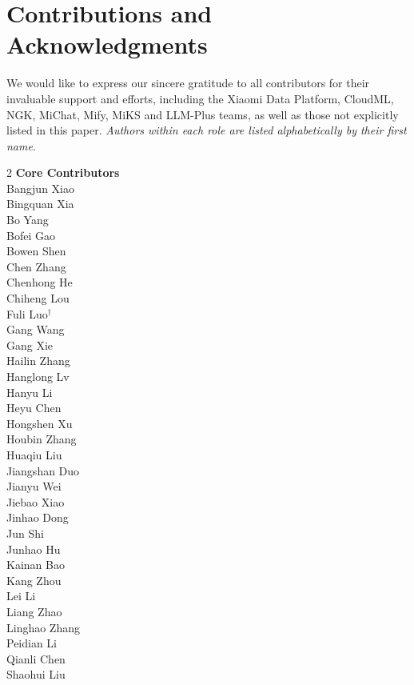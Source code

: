 \section{Contributions and Acknowledgments}
We would like to express our sincere gratitude to all contributors for their invaluable support and
efforts, including the Xiaomi Data Platform, CloudML, NGK, MiChat, Mify, MiKS and LLM-Plus teams, as
well as those not explicitly listed in this paper.
\textit{Authors within each role are listed alphabetically by their first name}.

{\renewcommand{\thefootnote}{\fnsymbol{footnote}}}

\begin{multicols}{2} %
\noindent
\textbf{Core Contributors} \\
Bangjun Xiao   \\
Bingquan Xia \\
Bo Yang \\
Bofei Gao \\
Bowen Shen \\
Chen Zhang \\
Chenhong He \\
Chiheng Lou \\
Fuli Luo$^\dagger$ \\
Gang Wang \\
Gang Xie \\
Hailin Zhang \\
Hanglong Lv \\
Hanyu Li   \\
Heyu Chen   \\
Hongshen Xu \\
Houbin Zhang   \\
Huaqiu Liu \\
Jiangshan Duo   \\
Jianyu Wei   \\
Jiebao Xiao \\
Jinhao Dong \\
Jun Shi \\
Junhao Hu   \\
Kainan Bao \\
Kang Zhou  \\
Lei Li \\
Liang Zhao \\
Linghao Zhang   \\
Peidian Li \\
Qianli Chen   \\
Shaohui Liu \\

\end{multicols}
